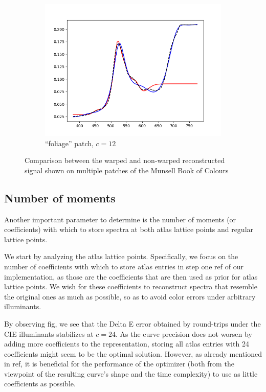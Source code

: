 \begin{figure}[t]
\begin{subfigure}[t]{0.45\textwidth}
		\includegraphics[width=\linewidth]{img/results_techniqueFoliage.png}
		\caption{``foliage'' patch, $c = 12$}
		\label{fig:resultsWarping_foliage}
	\end{subfigure}
	\caption{Comparison between the warped and non-warped reconstructed signal shown on multiple patches of the Munsell Book of Colours}
	\label{fig:resultsWarping}
\end{figure}

\subsection{Number of moments} \label{ssec:noOfMoments}

Another important parameter to determine is the number of moments (or coefficients) with which to store spectra at both atlas lattice points and regular lattice points.

We start by analyzing the atlas lattice points. Specifically, we focus on the number of coefficients with which to store atlas entries in step one ref of our implementation, as those are the coefficients that are then used as prior for atlas lattice points. We wish for these coefficients to reconstruct spectra that resemble the original ones as much as possible, so as to avoid color errors under arbitrary illuminants.

By observing fig, we see that the Delta E error obtained by round-trips under the CIE illuminants stabilizes at $c=24$. As the curve precision does not worsen by adding more coefficients to the representation, storing all atlas entries with 24 coefficients might seem to be the optimal solution. However, as already mentioned in ref, it is beneficial for the performance of the optimizer (both from the viewpoint of the resulting curve's shape and the time complexity) to use as little coefficients as possible.

